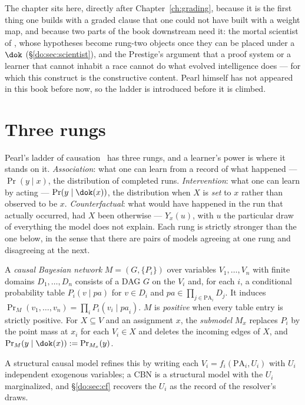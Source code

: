 The chapter sits here, directly after Chapter~\ref{ch:grading}, because it is the first thing one
builds with a graded clause that one could not have built with a weight map, and because two parts
of the book downstream need it: the mortal scientist of \chSci, whose hypotheses become
rung-two objects once they can be placed under a $\dok$ (\S\ref{do:sec:scientist}), and the
Prestige's argument that a proof system or a learner that cannot inhabit a race cannot do what
evolved intelligence does --- for which this construct is the constructive content. Pearl himself
has not appeared in this book before now, so the ladder is introduced before it is climbed.

\section{Three rungs}
\label{do:sec:ladder}

Pearl's ladder of causation~\cite{Pearl09} has three rungs, and a learner's power is where it
stands on it. \emph{Association}: what one can learn from a record of what happened ---
$\Pr(y \mid x)$, the distribution of completed runs. \emph{Intervention}: what one can learn by
acting --- $\Pr(y \mid \dok(x))$, the distribution when $X$ is \emph{set} to $x$ rather than
observed to be $x$. \emph{Counterfactual}: what would have happened in the run that actually
occurred, had $X$ been otherwise --- $Y_x(u)$, with $u$ the particular draw of everything the
model does not explain. Each rung is strictly stronger than the one below, in the sense that
there are pairs of models agreeing at one rung and disagreeing at the next.

\begin{definition}
\label{do:def:cbn}
A \emph{causal Bayesian network} $M = (G,\{P_i\})$ over variables $V_1,\dots,V_n$ with finite
domains $D_1,\dots,D_n$ consists of a DAG $G$ on the $V_i$ and, for each $i$, a conditional
probability table $P_i(v \mid \mathit{pa})$ for $v \in D_i$ and
$\mathit{pa} \in \prod_{j\in\mathrm{PA}_i} D_j$. It induces
$\Pr_M(v_1,\dots,v_n) = \prod_i P_i(v_i \mid \mathit{pa}_i)$. $M$ is \emph{positive} when every
table entry is strictly positive. For $X \subseteq V$ and an assignment $x$, the \emph{submodel}
$M_x$ replaces $P_i$ by the point mass at $x_i$ for each $V_i \in X$ and deletes the incoming
edges of $X$, and $\Pr_M(y \mid \dok(x)) := \Pr_{M_x}(y)$.
\end{definition}

A structural causal model refines this by writing each $V_i = f_i(\mathrm{PA}_i, U_i)$ with
$U_i$ independent exogenous variables; a CBN is a structural model with the $U_i$ marginalized,
and \S\ref{do:sec:cf} recovers the $U_i$ as the record of the resolver's draws.

